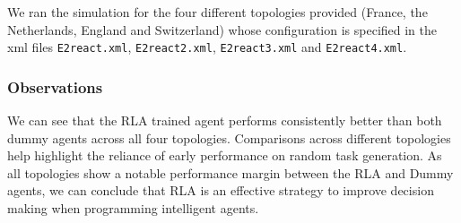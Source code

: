 \documentclass[11pt]{article}
\begin{document}
We ran the simulation for the four different topologies provided (France, the Netherlands, England and Switzerland) whose configuration is specified in the xml files \texttt{E2react.xml}, \texttt{E2react2.xml}, \texttt{E2react3.xml} and \texttt{E2react4.xml}.\\

\subsubsection{Observations}
We can see that the RLA trained agent performs consistently better than both dummy agents across all four topologies. Comparisons across different topologies help highlight the reliance of early performance on random task generation. As all topologies show a notable performance margin between the RLA and Dummy agents, we can conclude that RLA is an effective strategy to improve decision making when programming intelligent agents.
\end{document}
